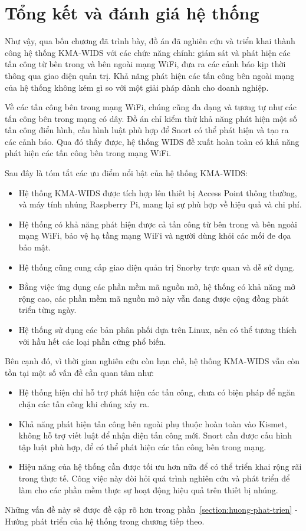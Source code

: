 \section{Tổng kết và đánh giá hệ thống}
Như vậy, qua bốn chương đã trình bày, đồ án đã nghiên cứu và triển khai thành công hệ thống KMA-WIDS với các chức năng chính: giám sát và phát hiện các tấn công từ bên trong và bên ngoài mạng WiFi, đưa ra các cảnh báo kịp thời thông qua giao diện quản trị. Khả năng phát hiện các tấn công bên ngoài mạng của hệ thống không kém gì so với một giải pháp dành cho doanh nghiệp.

Về các tấn công bên trong mạng WiFi, chúng cũng đa dạng và tương tự như các tấn công bên trong mạng có dây. Đồ án chỉ kiểm thử khả năng phát hiện một số tấn công điển hình, cấu hình luật phù hợp để Snort có thể phát hiện và tạo ra các cảnh báo. Qua đó thấy được, hệ thống WIDS đề xuất hoàn toàn có khả năng phát hiện các tấn công bên trong mạng WiFi.

Sau đây là tóm tắt các ưu điểm nổi bật của hệ thống KMA-WIDS:

\begin{itemize}
\item Hệ thống KMA-WIDS được tích hợp lên thiết bị Access Point thông thường, và máy tính nhúng Raspberry Pi, mang lại sự phù hợp về hiệu quả và chi phí.
\item Hệ thống có khả năng phát hiện được cả tấn công từ bên trong và bên ngoài mạng WiFi, bảo vệ hạ tầng mạng WiFi và người dùng khỏi các mối đe dọa bảo mật.
\item Hệ thống cũng cung cấp giao diện quản trị Snorby trực quan và dễ sử dụng.
\item Bằng việc ứng dụng các phần mềm mã nguồn mở, hệ thống có khả năng mở rộng cao, các phần mềm mã nguồn mở này vẫn đang được cộng đồng phát triển từng ngày.
\item Hệ thống sử dụng các bản phân phối dựa trên Linux, nên có thể tương thích với hầu hết các loại phần cứng phổ biến.\\
\end{itemize}

Bên cạnh đó, vì thời gian nghiên cứu còn hạn chế, hệ thống KMA-WIDS vẫn còn tồn tại một số vấn đề cần quan tâm như:

\begin{itemize}
\item Hệ thống hiện chỉ hỗ trợ phát hiện các tấn công, chưa có biện pháp để ngăn chặn các tấn công khi chúng xảy ra.
\item Khả năng phát hiện tấn công bên ngoài phụ thuộc hoàn toàn vào Kismet, không hỗ trợ viết luật để nhận diện tấn công mới. Snort cần được cấu hình tập luật phù hợp, để có thể phát hiện các tấn công bên trong mạng.
\item Hiệu năng của hệ thống cần được tối ưu hơn nữa để có thể triển khai rộng rãi trong thực tế. Công việc này đòi hỏi quá trình nghiên cứu và phát triển để làm cho các phần mềm thực sự hoạt động hiệu quả trên thiết bị nhúng.\\
\end{itemize}

Những vấn đề này sẽ được đề cập rõ hơn trong phần~\ref{section:huong-phat-trien} - Hướng phát triển của hệ thống trong chương tiếp theo.

